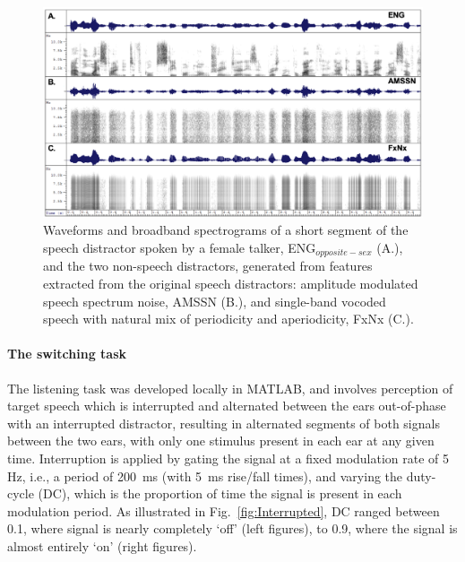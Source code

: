 \documentclass[a4paper, twoside]{templates/ociamthesis}
\begin{document}
\begin{figure}[ht]
\center
\includegraphics[width=\textwidth]{figures/Chapt1/MaskerType.PNG}
\caption{\label{fig:MaskerType}{Waveforms and broadband spectrograms of a short segment of the speech distractor spoken by a female talker, ENG$_{opposite-sex}$ (A.), and the two non-speech distractors, generated from features extracted from the original speech distractors: amplitude modulated speech spectrum noise, AMSSN (B.), and single-band vocoded speech with natural mix of periodicity and aperiodicity, FxNx (C.).}}
\end{figure}

\hypertarget{the-switching-task}{%
\paragraph{The switching task}\label{the-switching-task}}

The listening task was developed locally in MATLAB, and involves perception of target speech which is interrupted and alternated between the ears out-of-phase with an interrupted distractor, resulting in alternated segments of both signals between the two ears, with only one stimulus present in each ear at any given time.
Interruption is applied by gating the signal at a fixed modulation rate of 5 Hz, i.e., a period of 200~ms (with 5~ms rise/fall times), and varying the duty-cycle (DC), which is the proportion of time the signal is present in each modulation period. As illustrated in Fig.~\ref{fig:Interrupted}, DC ranged between 0.1, where signal is nearly completely `off' (left figures), to 0.9, where the signal is almost entirely `on' (right figures).
\end{document}

